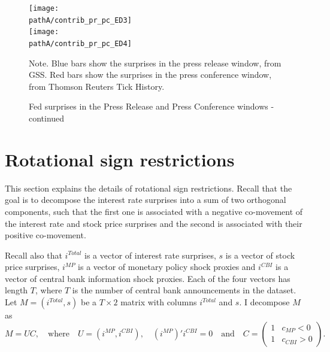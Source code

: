 \documentclass[a4paper,12pt]{article}
\newcommand{\pathA}{}
\begin{document}
\begin{figure}[p]
\caption{Fed surprises in the Press Release and Press Conference windows - continued}\label{fig: fed pr and pc 3}
\begin{center}
\texttt{[image: \\pathA/contrib\_pr\_pc\_ED3]}\\
\texttt{[image: \\pathA/contrib\_pr\_pc\_ED4]}\\
\end{center}
\footnotesize Note. Blue bars show the surprises in the press release window, from GSS. Red bars show the surprises in the press conference window, from Thomson Reuters Tick History.
\end{figure}


\clearpage

\section{Rotational sign restrictions}
\newcommand{\vsmp}{\frac{\operatorname{var}(i^{MP})}{\operatorname{var}(i^{Total})}}
\newcommand{\vscbi}{\frac{\operatorname{var}(i^{CBI})}{\operatorname{var}(i^{Total})}}

This section explains the details of rotational sign restrictions. Recall that the goal is to decompose the interest rate surprises into a sum of two orthogonal
components, such that the first one is associated with a negative
co-movement of the interest rate and stock price surprises and the second is associated with their positive co-movement.

Recall also that $i^{Total}$ is a vector of interest rate surprises, $s$ is a vector of stock price surprises, $i^{MP}$ is a vector of monetary policy shock proxies and $i^{CBI}$ is a vector of central bank information shock proxies. Each of the four vectors has length $T$, where $T$ is the number of central bank announcements in the dataset. Let $M=(i^{Total},s)$ be a $T \times 2$ matrix with columns $i^{Total}$ and $s$.
I decompose $M$ as
\begin{equation} M = UC,\quad  \text{where}\quad U=\left(i^{MP},i^{CBI}\right), \quad (i^{MP})'i^{CBI}=0 \quad \text{and}\quad
C=\begin{pmatrix}1&c_{MP}<0\\1&c_{CBI}>0\end{pmatrix}.\label{eq: rotational sign restrictions}
\end{equation}
\end{document}

